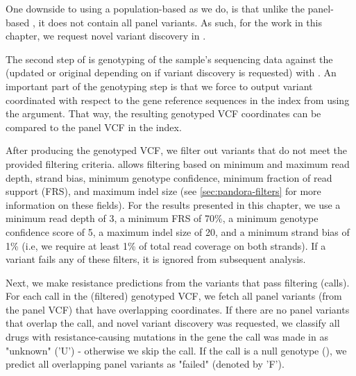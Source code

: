 One downside to using a population-based \prg{} as we do, is that unlike the panel-based \prg{}, it does not contain all panel variants. As such, for the work in this chapter, we request novel variant discovery in \drprg{} .

The second step of  is genotyping of the sample's sequencing data against the \prg{} (updated or original depending on if variant discovery is requested) with \pandora{} . An important part of the genotyping step is that we force \pandora{} to output variant coordinated with respect to the gene reference sequences in the index from  using the  argument. That way, the resulting genotyped VCF coordinates can be compared to the panel VCF in the index. 

After producing the \pandora{} genotyped VCF, we filter out variants that do not meet the provided filtering criteria. \drprg{}  allows filtering based on minimum and maximum read depth, strand bias, minimum genotype confidence, minimum fraction of read support (FRS), and maximum indel size (see \autoref{sec:pandora-filters} for more information on these fields). For the results presented in this chapter, we use a minimum read depth of 3, a minimum FRS of 70\%, a minimum genotype confidence score of 5, a maximum indel size of 20, and a minimum strand bias of 1\% (i.e, we require at least 1\% of total read coverage on both strands). If a variant fails any of these filters, it is ignored from subsequent analysis.

Next, we make resistance predictions from the variants that pass filtering (calls). For each call in the (filtered) genotyped VCF, we fetch all panel variants (from the panel VCF) that have overlapping coordinates. If there are no panel variants that overlap the call, and novel variant discovery was requested, we classify all drugs with resistance-causing mutations in the gene the call was made in as "unknown" ('U') - otherwise we skip the call. If the call is a null genotype (), we predict all overlapping panel variants as "failed" (denoted by 'F').

